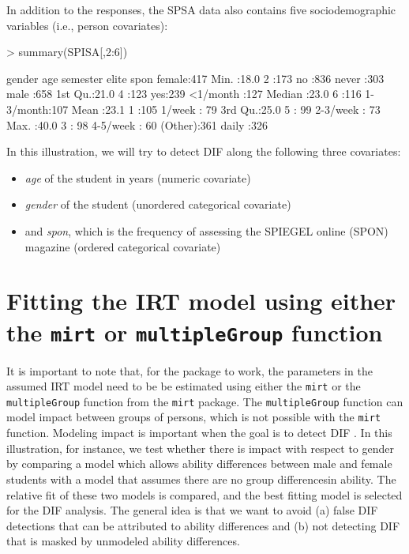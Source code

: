 \documentclass{article}
\begin{document}
In addition to the responses, the SPSA data also contains five sociodemographic variables (i.e., person covariates): 

\begin{Schunk}
\begin{Sinput}
> summary(SPISA[,2:6])
\end{Sinput}
\begin{Soutput}
    gender         age          semester   elite            spon    
 female:417   Min.   :18.0   2      :173   no :836   never    :303  
 male  :658   1st Qu.:21.0   4      :123   yes:239   <1/month :127  
              Median :23.0   6      :116             1-3/month:107  
              Mean   :23.1   1      :105             1/week   : 79  
              3rd Qu.:25.0   5      : 99             2-3/week : 73  
              Max.   :40.0   3      : 98             4-5/week : 60  
                             (Other):361             daily    :326  
\end{Soutput}
\end{Schunk}


In this illustration, we will try to detect DIF along the following three covariates: 
\begin{itemize}
\item \emph{age} of the student in years (numeric covariate)
\item \emph{gender} of the student (unordered categorical covariate)
\item and \emph{spon}, which is the frequency of assessing the SPIEGEL online (SPON) magazine (ordered categorical covariate)
\end{itemize}



\section{Fitting the IRT model using either the {\tt mirt} or {\tt multipleGroup} function}

It is important to note that, for the package to work, the parameters in the assumed IRT model need to be be estimated using either the {\tt mirt} or the {\tt multipleGroup} function from the {\tt  mirt} package. The {\tt multipleGroup} function can model impact between groups of persons, which is not possible with the {\tt mirt} function. Modeling impact is important when the goal is to detect DIF \cite{DeMars}. In this illustration, for instance, we test whether there is impact with respect to gender by comparing a model which allows ability differences between male and female students with a model that assumes there are no group differencesin ability. The relative fit of these two models is compared, and the best fitting model is selected for the DIF analysis. The general idea is that we want to avoid (a) false DIF detections that can be attributed to ability differences and (b) not detecting DIF that is masked by unmodeled ability differences.
\end{document}
